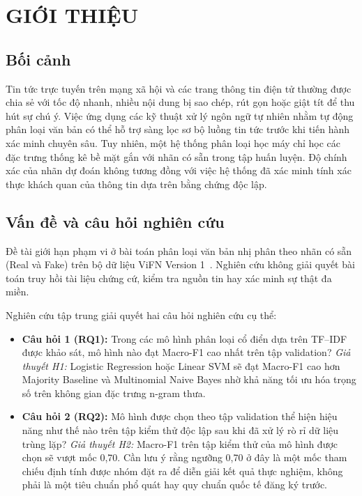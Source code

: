 \documentclass[12pt,a4paper]{report}
\begin{document}
\clearpage

\tableofcontents
\clearpage

\listoffigures
\clearpage

\listoftables
\clearpage

\setcounter{page}{1}

\chapter{GIỚI THIỆU}

\section{Bối cảnh}
Tin tức trực tuyến trên mạng xã hội và các trang thông tin điện tử thường được chia sẻ với tốc độ nhanh, nhiều nội dung bị sao chép, rút gọn hoặc giật tít để thu hút sự chú ý. Việc ứng dụng các kỹ thuật xử lý ngôn ngữ tự nhiên nhằm tự động phân loại văn bản có thể hỗ trợ sàng lọc sơ bộ luồng tin tức trước khi tiến hành xác minh chuyên sâu. Tuy nhiên, một hệ thống phân loại học máy chỉ học các đặc trưng thống kê bề mặt gắn với nhãn có sẵn trong tập huấn luyện. Độ chính xác của nhãn dự đoán không tương đồng với việc hệ thống đã xác minh tính xác thực khách quan của thông tin dựa trên bằng chứng độc lập.

\section{Vấn đề và câu hỏi nghiên cứu}
Đề tài giới hạn phạm vi ở bài toán phân loại văn bản nhị phân theo nhãn có sẵn (Real và Fake) trên bộ dữ liệu ViFN Version 1~\cite{huynh2025utilizing, vifn2025github}. Nghiên cứu không giải quyết bài toán truy hồi tài liệu chứng cứ, kiểm tra nguồn tin hay xác minh sự thật đa miền.

Nghiên cứu tập trung giải quyết hai câu hỏi nghiên cứu cụ thể:
\begin{itemize}[leftmargin=24pt]
  \item \textbf{Câu hỏi 1 (RQ1):} Trong các mô hình phân loại cổ điển dựa trên TF--IDF được khảo sát, mô hình nào đạt Macro-F1 cao nhất trên tập validation?
  \textit{Giả thuyết H1:} Logistic Regression hoặc Linear SVM sẽ đạt Macro-F1 cao hơn Majority Baseline và Multinomial Naive Bayes nhờ khả năng tối ưu hóa trọng số trên không gian đặc trưng n-gram thưa.
  \item \textbf{Câu hỏi 2 (RQ2):} Mô hình được chọn theo tập validation thể hiện hiệu năng như thế nào trên tập kiểm thử độc lập sau khi đã xử lý rò rỉ dữ liệu trùng lặp?
  \textit{Giả thuyết H2:} Macro-F1 trên tập kiểm thử của mô hình được chọn sẽ vượt mốc 0,70. Cần lưu ý rằng ngưỡng 0,70 ở đây là một mốc tham chiếu định tính được nhóm đặt ra để diễn giải kết quả thực nghiệm, không phải là một tiêu chuẩn phổ quát hay quy chuẩn quốc tế đăng ký trước.
\end{itemize}
\end{document}
